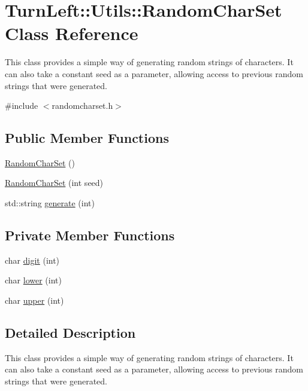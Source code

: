 \hypertarget{classTurnLeft_1_1Utils_1_1RandomCharSet}{
\section{TurnLeft::Utils::RandomCharSet Class Reference}
\label{classTurnLeft_1_1Utils_1_1RandomCharSet}
}


This class provides a simple way of generating random strings of characters. It can also take a constant seed as a parameter, allowing access to previous random strings that were generated.  




{\ttfamily \#include $<$randomcharset.h$>$}

\subsection*{Public Member Functions}
\begin{DoxyCompactItemize}
\item 
\hyperlink{classTurnLeft_1_1Utils_1_1RandomCharSet_a6f1627e394133bac59f72711f36a2a56}{RandomCharSet} ()
\item 
\hyperlink{classTurnLeft_1_1Utils_1_1RandomCharSet_ab5dc9b4ec2888735ff37423603db85f3}{RandomCharSet} (int seed)
\item 
std::string \hyperlink{classTurnLeft_1_1Utils_1_1RandomCharSet_a305db09f6fd847f08b0335a5334a76e5}{generate} (int)
\end{DoxyCompactItemize}
\subsection*{Private Member Functions}
\begin{DoxyCompactItemize}
\item 
char \hyperlink{classTurnLeft_1_1Utils_1_1RandomCharSet_a0a5376d136c91f1b4e91f192724e6380}{digit} (int)
\item 
char \hyperlink{classTurnLeft_1_1Utils_1_1RandomCharSet_a0d22c911e3c4b531b05b6edddd4c8673}{lower} (int)
\item 
char \hyperlink{classTurnLeft_1_1Utils_1_1RandomCharSet_a0f2b577fd31d7afa67017aaa4a961b20}{upper} (int)
\end{DoxyCompactItemize}


\subsection{Detailed Description}
This class provides a simple way of generating random strings of characters. It can also take a constant seed as a parameter, allowing access to previous random strings that were generated. 

